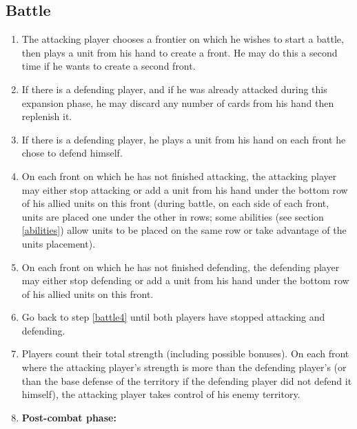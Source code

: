 \documentclass[a4paper]{article}
\begin{document}
    \subsection{Battle}
        \label{battle}
        \begin{enumerate}
            \item The attacking player chooses a frontier on which he wishes to start
                a battle, then plays a unit from his hand to create a front.
                He may do this a second time if he wants to create a second front.
            \item If there is a defending player,
                and if he was already attacked during this expansion phase,
                he may discard any number of cards from his hand then replenish it.
            \item If there is a defending player,
                he plays a unit from his hand on each front he chose to defend himself.
            \item On each front on which he has not finished attacking,
                the attacking player may either stop attacking or add a unit
                from his hand under the bottom row of his allied units on this front
                (during battle, on each side of each front,
                units are placed one under the other in rows; 
                some abilities (see section \ref{abilities}) allow units to be placed
                on the same row or take advantage of the units placement).
                \label{battle4}
            \item On each front on which he has not finished defending,
                the defending player may either stop defending or add a unit
                from his hand under the bottom row of his allied units on this front.
            \item Go back to step \ref{battle4} until both players have stopped
                attacking and defending.
                \label{battle6}
            \item Players count their total strength (including possible bonuses).
                On each front where the attacking player's strength is more than
                the defending player's (or than the base defense of the territory
                if the defending player did not defend it himself),
                the attacking player takes control of his enemy territory.
                \label{battle7}
            \item \textbf{Post-combat phase:}\\

\end{enumerate}
\end{document}
